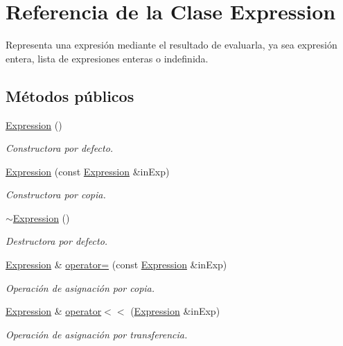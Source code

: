\hypertarget{class_expression}{}\section{Referencia de la Clase Expression}
\label{class_expression}


Representa una expresión mediante el resultado de evaluarla, ya sea expresión entera, lista de expresiones enteras o indefinida.  


\subsection*{Métodos públicos}
\begin{DoxyCompactItemize}
\item 
\hyperlink{class_expression_afcf87716bf0abfe8d414c92529e1564a}{Expression} ()
\begin{DoxyCompactList}\small\item\em Constructora por defecto. \end{DoxyCompactList}\item 
\hyperlink{class_expression_ae84af9ba2a88741d6f65a70ef8869faf}{Expression} (const \hyperlink{class_expression}{Expression} \&in\+Exp)
\begin{DoxyCompactList}\small\item\em Constructora por copia. \end{DoxyCompactList}\item 
\hyperlink{class_expression_a3e99570b177da619eeb2c5787cbb148e}{$\sim$\+Expression} ()
\begin{DoxyCompactList}\small\item\em Destructora por defecto. \end{DoxyCompactList}\item 
\hyperlink{class_expression}{Expression} \& \hyperlink{class_expression_a475cbe6b9d4f0b8b7a3fe50325604bf3}{operator=} (const \hyperlink{class_expression}{Expression} \&in\+Exp)
\begin{DoxyCompactList}\small\item\em Operación de asignación por copia. \end{DoxyCompactList}\item 
\hyperlink{class_expression}{Expression} \& \hyperlink{class_expression_abc1e03965a5475c61e7c05ca49fbc395}{operator$<$$<$} (\hyperlink{class_expression}{Expression} \&in\+Exp)
\begin{DoxyCompactList}\small\item\em Operación de asignación por transferencia. \end{DoxyCompactList}\item 

\end{DoxyCompactItemize}
